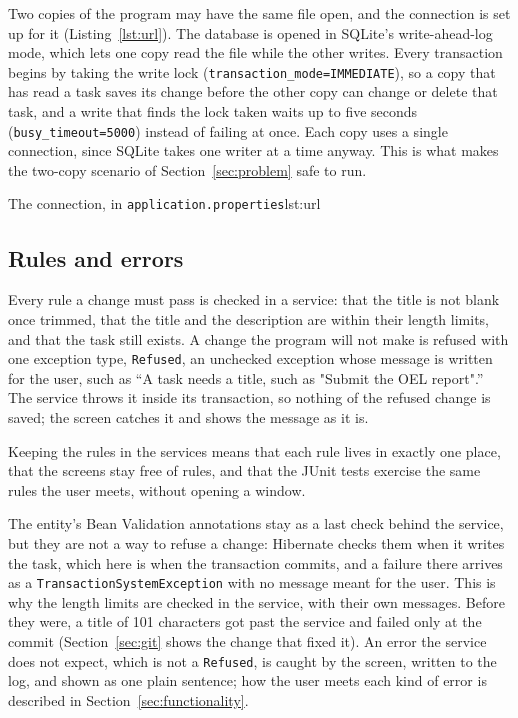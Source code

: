 Two copies of the program may have the same file open, and the connection is set up for it (Listing~\ref{lst:url}).
The database is opened in SQLite's write-ahead-log mode, which lets one copy read the file while the other writes.
Every transaction begins by taking the write lock (\texttt{transaction\_mode=IMMEDIATE}), so a copy that has read a
task saves its change before the other copy can change or delete that task, and a write that finds the lock taken
waits up to five seconds (\texttt{busy\_timeout=5000}) instead of failing at once. Each copy uses a single
connection, since SQLite takes one writer at a time anyway. This is what makes the two-copy scenario of
Section~\ref{sec:problem} safe to run.

  {The connection, in \texttt{application.properties}}{lst:url}

\subsection{Rules and errors}

Every rule a change must pass is checked in a service: that the title is not blank once trimmed, that the title and
the description are within their length limits, and that the task still exists. A change the program will not make
is refused with one exception type, \texttt{Refused}, an unchecked exception whose message is written for the user,
such as ``A task needs a title, such as "Submit the OEL report".'' The service throws it inside its transaction, so
nothing of the refused change is saved; the screen catches it and shows the message as it is.

Keeping the rules in the services means that each rule lives in exactly one place, that the screens stay free of
rules, and that the JUnit tests exercise the same rules the user meets, without opening a window.

The entity's Bean Validation annotations stay as a last check behind the service, but they are not a way to refuse a
change: Hibernate checks them when it writes the task, which here is when the transaction commits, and a failure
there arrives as a \texttt{TransactionSystemException} with no message meant for the user. This is why the length limits are checked in
the service, with their own messages. Before they were, a title of 101 characters got past the service and failed
only at the commit (Section~\ref{sec:git} shows the change that fixed it).
An error the service does not expect, which is not a \texttt{Refused}, is caught by the screen, written to the log,
and shown as one plain sentence; how the user meets each kind of error is described in
Section~\ref{sec:functionality}.

